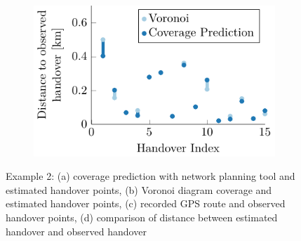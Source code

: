 \documentclass[master,english]{hgbthesis}
\begin{document}
\begin{figure}
\begin{subfigure}[b]{0.5\linewidth}
			\caption{}
			\label{fig:1058_handover}
		\end{subfigure}%
		~
		\begin{subfigure}[b]{0.5\linewidth}
			\includegraphics[width=\textwidth]{./images/1058_predvorcomp}
			\caption{}
			\label{fig:1058_distcomp}
		\end{subfigure}
	\caption{Example 2: (a) coverage prediction with network planning tool and estimated handover points, (b) Voronoi diagram coverage and estimated handover points, (c) recorded GPS route and observed handover points, (d) comparison of distance between estimated handover and observed handover}\label{fig:1058overview}
\end{figure}
\end{document}

